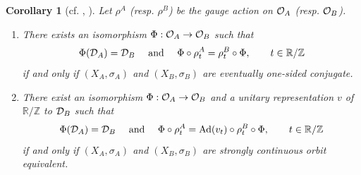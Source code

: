 \documentclass[11pt]{article}
\newtheorem{corollary}[theorem]{Corollary}
\theoremstyle{plain}
\theoremstyle{definition}
\numberwithin{equation}{section}
\renewcommand{\labelenumi}{\textup{(\theenumi)}}
\newcommand{\Ad}{\operatorname{Ad}}
\newcommand{\RZ}{\mathbb{R}/{\mathbb{Z}}}
\newcommand{\Z}{\mathbb{Z}}
\begin{document}
\begin{corollary}[{cf. \cite[2,17. Proposition]{CK},
\cite[Theorem 6.7]{MaPre2014}}] \label{coro:evstcoe}
Let $\rho^A$ (resp. $\rho^B$)
be the gauge action on ${{\mathcal{O}}_A}$ (resp. ${{\mathcal{O}}_B}$).
\begin{enumerate}
\renewcommand{\theenumi}{\roman{enumi}}
\renewcommand{\labelenumi}{\textup{(\theenumi)}}
\item
There exists an isomorphism
$\Phi:{{\mathcal{O}}_A} \rightarrow {{\mathcal{O}}_B}$ 
such that 
\begin{equation*}
\Phi(\DA) = \DB
\quad 
\text{  and }
\quad
\Phi \circ \rho^A_t = \rho^B_t \circ \Phi, 
\qquad t \in {\RZ}
\end{equation*}
if and only if 
$(X_A, \sigma_A)$ and $(X_B,\sigma_B)$
are eventually one-sided conjugate.
\item
There exist an isomorphism
$\Phi:{{\mathcal{O}}_A} \rightarrow {{\mathcal{O}}_B}$ 
and a unitary representation $v$ of $\RZ$ to ${{\mathcal{D}}_B}$
such that 
\begin{equation*}
\Phi(\DA) = \DB
\quad 
\text{  and }
\quad
\Phi \circ \rho^A_t = \Ad(v_t)\circ \rho^B_t \circ \Phi, 
\qquad t \in {\RZ}
\end{equation*}
if and only if 
$(X_A, \sigma_A)$ and $(X_B,\sigma_B)$
are strongly continuous orbit equivalent.
\end{enumerate}
\end{corollary}
\end{document}
